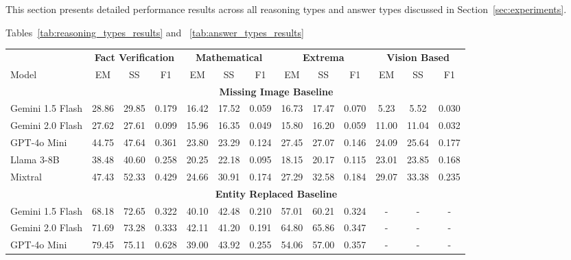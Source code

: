 \documentclass[11pt]{article}
\begin{document}
This section presents detailed performance results across all reasoning types and answer types discussed in Section~\ref{sec:experiments}.

Tables~\ref{tab:reasoning_types_results} and ~\ref{tab:answer_types_results}


\begin{table}[h]
\vspace{-0.5em}
\scriptsize
\centering
\setlength{\aboverulesep}{0pt}
\setlength{\belowrulesep}{0pt}
\setlength{\tabcolsep}{7.5pt}
\begin{tabular}{lccc|ccc|ccc|ccc}
\toprule
\multicolumn{1}{c}{} & \multicolumn{3}{c|}{\textbf{Fact Verification}} & \multicolumn{3}{c|}{\textbf{Mathematical}} & \multicolumn{3}{c|}{\textbf{Extrema}} & \multicolumn{3}{c}{\textbf{Vision Based}} \\
\cmidrule{2-13}
Model & EM & SS & F1 & EM & SS & F1 & EM & SS & F1 & EM & SS & F1 \\
\cmidrule{2-13}
& \multicolumn{12}{c}{\textbf{Missing Image Baseline}} \\
\cmidrule{2-13}
\midrule
Gemini 1.5 Flash & 28.86 & 29.85 & 0.179 & 16.42 & 17.52 & 0.059 & 16.73 & 17.47 & 0.070 & 5.23 & 5.52 & 0.030 \\
Gemini 2.0 Flash & 27.62 & 27.61 & 0.099 & 15.96 & 16.35 & 0.049 & 15.80 & 16.20 & 0.059 & 11.00 & 11.04 & 0.032 \\
GPT-4o Mini     & 44.75 & 47.64 & 0.361 & 23.80 & 23.29 & 0.124 & 27.45 & 27.07 & 0.146 & 24.09 & 25.64 & 0.177 \\
Llama 3-8B      & 38.48 & 40.60 & 0.258 & 20.25 & 22.18 & 0.095 & 18.15 & 20.17 & 0.115 & 23.01 & 23.85 & 0.168 \\
Mixtral    & \cellcolor{yellow}47.43 & \cellcolor{yellow}52.33 & \cellcolor{yellow}0.429 & \cellcolor{yellow}24.66 & \cellcolor{yellow}30.91 & \cellcolor{yellow}0.174 & \cellcolor{yellow}27.29 & \cellcolor{yellow}32.58 & \cellcolor{yellow}0.184 & \cellcolor{yellow}29.07 & \cellcolor{yellow}33.38 & \cellcolor{yellow}0.235 \\
\cmidrule{2-13}
& \multicolumn{12}{c}{\textbf{Entity Replaced Baseline}} \\
\cmidrule{2-13}
Gemini 1.5 Flash & 68.18 & 72.65 & 0.322 & 40.10 & 42.48 & 0.210 & 57.01 & 60.21 & 0.324 & - & - & - \\
Gemini 2.0 Flash & 71.69 & 73.28 & 0.333 & \cellcolor{yellow}42.11 & 41.20 & 0.191 & \cellcolor{yellow}64.80 & \cellcolor{yellow}65.86 & 0.347 & - & - & - \\
GPT-4o Mini     & 79.45 & 75.11 & 0.628 & 39.00 & \cellcolor{yellow}43.92 & \cellcolor{yellow}0.255 & 54.06 & 57.00 & \cellcolor{yellow}0.357 & - & - & - \\

\end{tabular}
\end{table}
\end{document}
